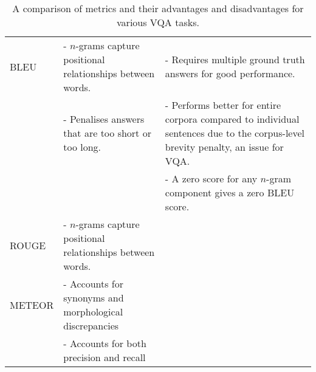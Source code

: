 \begin{table}[htbp]
\begin{footnotesize}
\begin{tabularx}{\linewidth}{@{}lLL@{}}
            BLEU                                & - \(n\)-grams capture positional relationships between words.                              & - Requires multiple ground truth answers for good performance.                                                                                                          \\
                                                & - Penalises answers that are too short or too long.                                        & - Performs better for entire corpora compared to individual sentences due to the corpus-level brevity penalty, an issue for VQA.                                        \\
                                                &                                                                                            & - A zero score for any \(n\)-gram component gives a zero BLEU score.                                                                                                    \\ \midrule
            ROUGE                               & - \(n\)-grams capture positional relationships between words.                              &                                                                                                                                                                         \\ \midrule
            METEOR                              & - Accounts for synonyms and morphological discrepancies                                                                   &                                                                                                                                                                         \\
                                                & - Accounts for both precision and recall                                                   &                                                                                                                                                                         \\ \bottomrule
    \end{tabularx}
    \end{footnotesize}
    \caption[Advantages and disadvantages of metrics for various VQA tasks]{A comparison of metrics and their advantages and disadvantages for various VQA tasks.}
    \label{tab:vqa_metrics_comparison}
\end{table}

